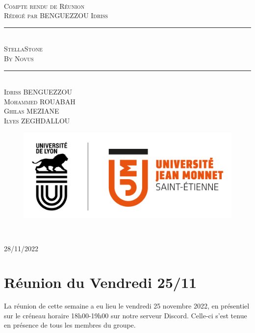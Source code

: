 \documentclass[a4paper, 12pt]{article}
\newcommand{\HRule}{\rule{\linewidth}{0.5mm}}
\begin{document}
\begin{titlepage}
  \begin{sffamily}
  \begin{center}

   
    \textsc{\LARGE }\\[2cm]

    \textsc{\Large Compte rendu de Réunion}\\[1.5cm]
    \textsc{\Medium Rédigé par BENGUEZZOU Idriss}

    \HRule \\[0.4cm]
    { \huge  \textsc{StellaStone} \\
    \textsc{\Large By Novus}\\ [0.4cm] }
	

    \HRule \\[2cm]
    \textsc {Idriss BENGUEZZOU\\Mohammed ROUABAH\\Ghilas MEZIANE \\ Ilyes ZEGHDALLOU}
 \begin{figure}
     \centering
    \includegraphics[scale=0.2]{logoUJM.png}
     \label{fig:ujm_logo}
 \end{figure}
   
    \

    \vfill

    {\large {} 28/11/2022}

  \end{center}
  \end{sffamily}
\end{titlepage}

\newpage

\section{Réunion du Vendredi 25/11}
La réunion de cette semaine a eu lieu le vendredi 25 novembre 2022, en présentiel sur le créneau horaire 18h00-19h00 sur notre serveur Discord.
Celle-ci s'est tenue en présence de tous les membres du groupe.
\end{document}
